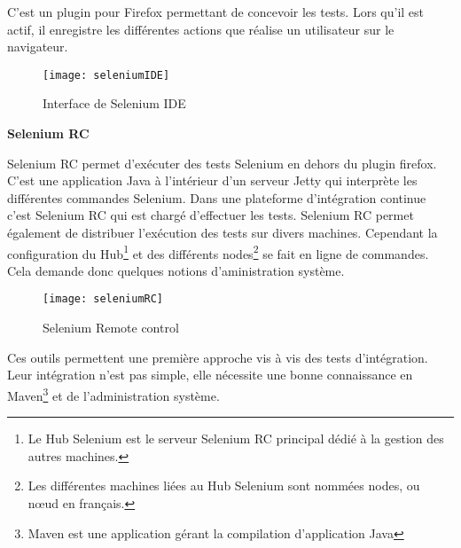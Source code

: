 		C'est un plugin pour Firefox permettant de concevoir les tests. Lors qu'il est actif, il enregistre
		les différentes actions que réalise un utilisateur sur le navigateur.
		\begin{figure}[!h]
     		\begin{center}
			      \texttt{[image: seleniumIDE]}
			      \caption{Interface de Selenium IDE}
			      \label{seleniumIDE}
		    \end{center}
		\end{figure}		
		

\newpage
\textbf{Selenium RC}

		Selenium RC permet d'exécuter des tests Selenium en dehors du plugin firefox. C'est une
		application Java à l'intérieur d'un serveur Jetty qui interprète les différentes commandes Selenium.
		Dans une plateforme d'intégration continue c'est Selenium RC qui est chargé d'effectuer les tests.
		Selenium RC permet également de distribuer l'exécution des tests sur divers machines. Cependant
		la configuration du Hub\footnote{Le Hub Selenium est le serveur Selenium RC principal dédié à la gestion
		des autres machines.} et des différents nodes\footnote{Les différentes machines liées au Hub Selenium sont
		nommées nodes, ou nœud en français.} se fait en ligne de commandes. Cela demande donc quelques notions
		d'aministration système.
		\begin{figure}[!h]
     		\begin{center}
			      \texttt{[image: seleniumRC]}
			      \caption{Selenium Remote control}
			      \label{seleniumRC}
		    \end{center}
		\end{figure}	

 		


Ces outils permettent une première approche vis à vis des tests d'intégration. Leur intégration n'est pas simple, elle nécessite une bonne connaissance en Maven\footnote{Maven est une application gérant la compilation d'application Java} et
de l'administration système. 

